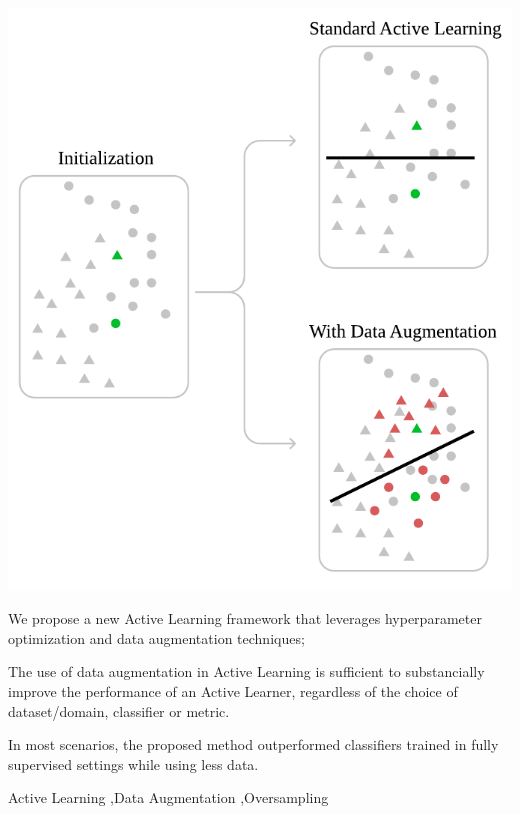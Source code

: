 \documentclass[preprint, 12pt]{elsarticle}
\begin{document}
\begin{frontmatter}
\begin{graphicalabstract}
    \includegraphics{../analysis/graphical_abstract}
\end{graphicalabstract}

\begin{highlights}
    \item We propose a new Active Learning framework that leverages
        hyperparameter optimization and data augmentation techniques;
    \item The use of data augmentation in Active Learning is sufficient to
        substancially improve the performance of an Active Learner, regardless of the
        choice of dataset/domain, classifier or metric.
    \item In most scenarios, the proposed method outperformed classifiers
        trained in fully supervised settings while using less data.
\end{highlights}

\begin{keyword}
Active Learning \sep\@ Data Augmentation \sep\@ Oversampling
\end{keyword}

\end{frontmatter}
\end{document}
